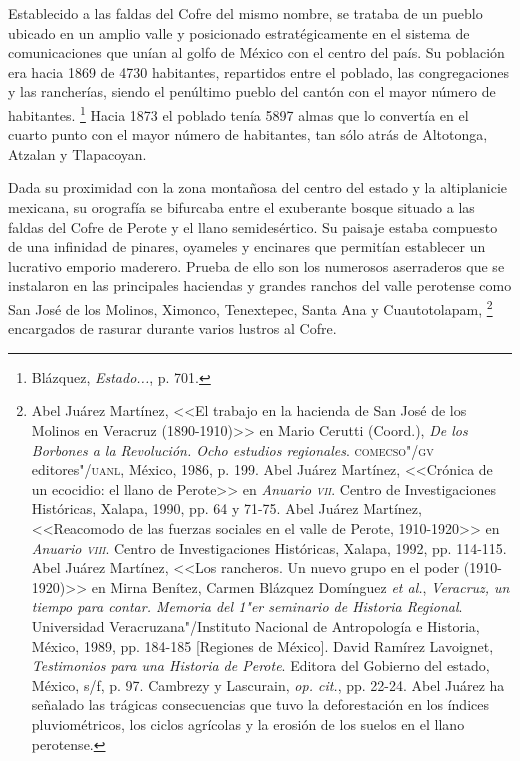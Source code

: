 \documentclass[14pt,twoside,final]{extbook} %
\let\oldfootnote\footnote
\renewcommand\footnote[1]{%
\oldfootnote{\hspace{1mm}#1}}
\begin{document}
Establecido a las faldas del Cofre del mismo nombre, se trataba de un pueblo ubicado en un amplio valle y posicionado estratégicamente en el sistema de comunicaciones que unían al golfo de México con el centro del país. Su población era hacia 1869 de 4730 habitantes, repartidos entre el poblado, las congregaciones y las rancherías, siendo el penúltimo pueblo del cantón con el mayor número de habitantes.\footnote{Blázquez, \emph{Estado...}, p. 701.} Hacia 1873 el poblado tenía 5897 almas que lo convertía en el cuarto punto con el mayor número de habitantes, tan sólo atrás de Altotonga, Atzalan y Tlapacoyan.

Dada su proximidad con la zona montañosa del centro del estado y la altiplanicie mexicana, su orografía se bifurcaba entre el exuberante bosque situado a las faldas del Cofre de Perote y el llano semidesértico. Su paisaje estaba compuesto de una infinidad de pinares, oyameles y encinares que permitían establecer un lucrativo emporio maderero. Prueba de ello son los numerosos aserraderos que se instalaron en las principales haciendas y grandes ranchos del valle perotense como San José de los Molinos, Ximonco, Tenextepec, Santa Ana y Cuautotolapam,\footnote{Abel Juárez Martínez, <<El trabajo en la hacienda de San José de los Molinos en Veracruz \mbox{(1890-1910)}>> en Mario Cerutti (Coord.), \emph{De los Borbones a la Revolución. Ocho estudios regionales}. \textsc{comecso"/gv} editores"/\textsc{uanl}, México, 1986, p. 199. Abel Juárez Martínez, <<Crónica de un ecocidio: el llano de Perote>> en \emph{Anuario \textsc{vii}}. Centro de Investigaciones Históricas, Xalapa, 1990, pp. 64 y 71-75. Abel Juárez Martínez, <<Reacomodo de las fuerzas sociales en el valle de Perote, 1910-1920>> en \emph{Anuario \textsc{viii}}. Centro de Investigaciones Históricas, Xalapa, 1992, pp. 114-115. Abel Juárez Martínez, <<Los rancheros. Un nuevo grupo en el poder (1910-1920)>> en Mirna Benítez, Carmen Blázquez Domínguez \emph{et al.}, \emph{Veracruz, un tiempo para contar. Memoria del 1"er seminario de Historia Regional}. Universidad Veracruzana"/Instituto Nacional de Antropología e Historia, México, 1989, pp. 184-185 [Regiones de México]. David Ramírez Lavoignet, \emph{Testimonios para una Historia de Perote}. Editora del Gobierno del estado, México, s/f, p. 97. Cambrezy y Lascurain, \emph{op. cit.}, pp. 22-24. Abel Juárez ha señalado las trágicas consecuencias que tuvo la deforestación en los índices pluviométricos, los ciclos agrícolas y la erosión de los suelos en el llano perotense.} encargados de rasurar durante varios lustros al Cofre.
\end{document}
